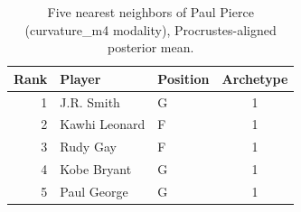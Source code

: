 \begin{table}[htbp]
  \centering\small
  \begin{tabular}{rllc}
    \toprule
    Rank & Player & Position & Archetype \\
    \midrule
    1 & J.R. Smith & G & 1 \\
    2 & Kawhi Leonard & F & 1 \\
    3 & Rudy Gay & F & 1 \\
    4 & Kobe Bryant & G & 1 \\
    5 & Paul George & G & 1 \\
    \bottomrule
  \end{tabular}
  \caption{Five nearest neighbors of Paul Pierce (curvature_m4 modality), Procrustes-aligned posterior mean.}
  \label{tab:Paul_Pierce_neighbors_curvature_m4}
\end{table}

